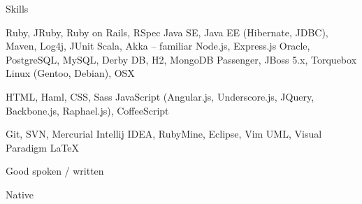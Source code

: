 \begin{rubric}{Skills}

\entry*
  Ruby, JRuby, Ruby on Rails, RSpec
\entry*
  Java SE, Java EE (Hibernate, JDBC), Maven, Log4j, JUnit
\entry*
  Scala, Akka – familiar
\entry*
  Node.js, Express.js
\entry*
  Oracle, PostgreSQL, MySQL, Derby DB, H2, MongoDB
\entry*
  Passenger, JBoss 5.x, Torquebox
\entry*
  Linux (Gentoo, Debian), OSX

\entry*
  HTML, Haml, CSS, Sass
\entry*
  JavaScript (Angular.js, Underscore.js, JQuery, Backbone.js, Raphael.js), CoffeeScript

\entry*
  Git, SVN, Mercurial
\entry*  
  Intellij IDEA, RubyMine, Eclipse, Vim
\entry*
  UML, Visual Paradigm
\entry*
  LaTeX


\entry*[English:]
  Good spoken / written

\entry*[Polish:]
  Native

\end{rubric}
